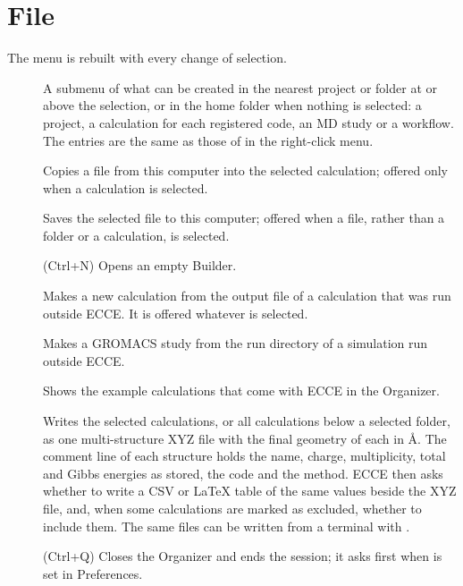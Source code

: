 \section{File}
The  menu is rebuilt with every change of selection.
\begin{description}
	\item[] A submenu of what can be created in the nearest project or folder at or above the selection, or in the home folder when nothing is selected: a project, a calculation for each registered code, an MD study or a workflow. The entries are the same as those of  in the right-click menu.
	\item[] Copies a file from this computer into the selected calculation; offered only when a calculation is selected.
	\item[] Saves the selected file to this computer; offered when a file, rather than a folder or a calculation, is selected.
	\item[] (\textsf{Ctrl+N}) Opens an empty Builder.
	\item[] Makes a new calculation from the output file of a calculation that was run outside ECCE. It is offered whatever is selected.
	\item[] Makes a GROMACS study from the run directory of a simulation run outside ECCE.
	\item[] Shows the example calculations that come with ECCE in the Organizer.
	\item[] Writes the selected calculations, or all calculations below a selected folder, as one multi-structure XYZ file with the final geometry of each in \AA{}. The comment line of each structure holds the name, charge, multiplicity, total and Gibbs energies as stored, the code and the method. ECCE then asks whether to write a CSV or \LaTeX{} table of the same values beside the XYZ file, and, when some calculations are marked as excluded, whether to include them. The same files can be written from a terminal with .
	\item[] (\textsf{Ctrl+Q}) Closes the Organizer and ends the session; it asks first when  is set in Preferences.
\end{description}

